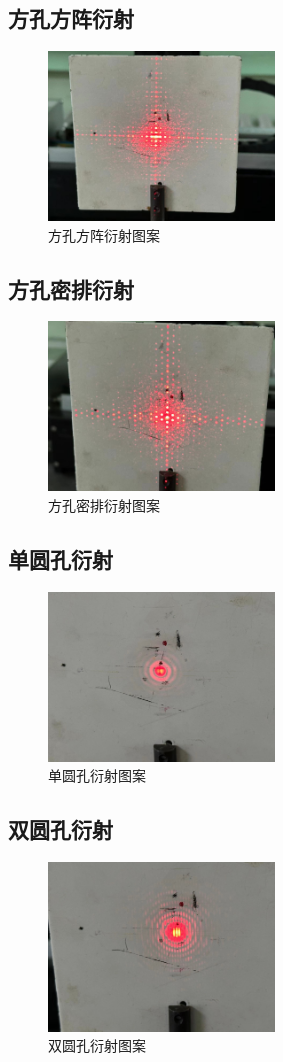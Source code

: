 \documentclass[a4paper]{ctexart}
\begin{document}
	\subsection{方孔方阵衍射}
	\begin{figure}[H]
		\centering
		\includegraphics[width=6cm]{3.jpg}
		\caption{方孔方阵衍射图案}
	\end{figure}
	\subsection{方孔密排衍射}
	\begin{figure}[H]
		\centering
		\includegraphics[width=6cm]{4.jpg}
		\caption{方孔密排衍射图案}
	\end{figure}
	\subsection{单圆孔衍射}
	\begin{figure}[H]
		\centering
		\includegraphics[width=6cm]{5.jpg}
		\caption{单圆孔衍射图案}
	\end{figure}
	\subsection{双圆孔衍射}
	\begin{figure}[H]
		\centering
		\includegraphics[width=6cm]{6.jpg}
		\caption{双圆孔衍射图案}
	\end{figure}
\end{document}
